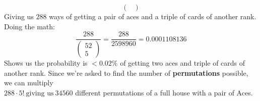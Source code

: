 \documentclass{article}
\begin{document}
\begin{enumerate}[label=\alph*)]
\begin{equation*}
\begin{pmatrix}
        \end{pmatrix}
    \end{equation*}
    Giving us \(288\) ways of getting a pair of aces and a triple of cards of another rank. Doing the math:
    \begin{equation*}
        \frac{288}{
            \begin{pmatrix}
                52 \\
                5
            \end{pmatrix}
        } = \frac{288}{2598960} = 0.0001108136
        \end{equation*}
    Shows us the probability is \(< 0.02\%\) of getting two aces and triple of cards of another rank.
    Since we're asked to find the number of \textbf{permutations} possible, we can multiply\\ 
    \(288 \cdot 5!\ \text{giving us}\ 34560\) different permutations of a full house with a pair of Aces.
\end{enumerate}
\end{document}
